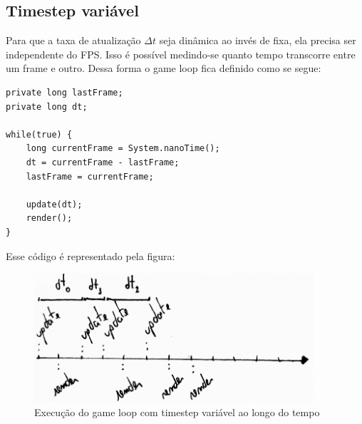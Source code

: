 \documentclass[12pt, 
openright, 
oneside, 
a4paper,    
brazil]{facom-ufu-abntex2}
\begin{document}
\subsection{Timestep variável}
Para que a taxa de atualização $\Delta t$ seja dinâmica ao invés de fixa, ela precisa ser independente do FPS. Isso é possível medindo-se quanto tempo transcorre entre um frame e outro. Dessa forma o game loop fica definido como se segue:

\begin{lstlisting}[caption=Game loop com timestep variável]
private long lastFrame;
private long dt;
		
while(true) {
	long currentFrame = System.nanoTime(); 
	dt = currentFrame - lastFrame;
	lastFrame = currentFrame;
	
	update(dt);
	render();
}
\end{lstlisting}
Esse código é representado pela figura:
\begin{figure}[H]
	\centering
	\includegraphics[width=28em]{imagens/ilu3_small.png}
	\caption{Execução do game loop com timestep variável ao longo do tempo}
\end{figure}
\end{document}

